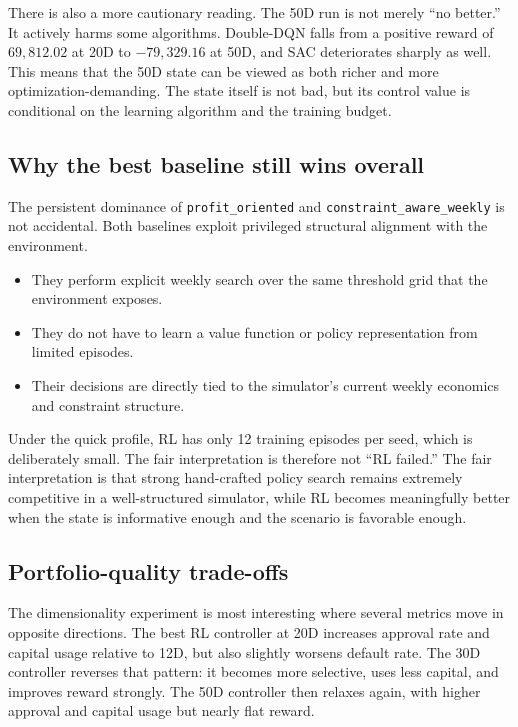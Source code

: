 \documentclass[12pt,a4paper]{article}
\begin{document}
There is also a more cautionary reading. The 50D run is not merely ``no better.'' It actively harms some algorithms. Double-DQN falls from a positive reward of $69{,}812.02$ at 20D to $-79{,}329.16$ at 50D, and SAC deteriorates sharply as well. This means that the 50D state can be viewed as both richer and more optimization-demanding. The state itself is not bad, but its control value is conditional on the learning algorithm and the training budget.

\subsection{Why the best baseline still wins overall}

The persistent dominance of \texttt{profit\_oriented} and \texttt{constraint\_aware\_weekly} is not accidental. Both baselines exploit privileged structural alignment with the environment.
\begin{itemize}[leftmargin=*]
    \item They perform explicit weekly search over the same threshold grid that the environment exposes.
    \item They do not have to learn a value function or policy representation from limited episodes.
    \item Their decisions are directly tied to the simulator's current weekly economics and constraint structure.
\end{itemize}

Under the quick profile, RL has only 12 training episodes per seed, which is deliberately small. The fair interpretation is therefore not ``RL failed.'' The fair interpretation is that strong hand-crafted policy search remains extremely competitive in a well-structured simulator, while RL becomes meaningfully better when the state is informative enough and the scenario is favorable enough.

\subsection{Portfolio-quality trade-offs}

The dimensionality experiment is most interesting where several metrics move in opposite directions. The best RL controller at 20D increases approval rate and capital usage relative to 12D, but also slightly worsens default rate. The 30D controller reverses that pattern: it becomes more selective, uses less capital, and improves reward strongly. The 50D controller then relaxes again, with higher approval and capital usage but nearly flat reward.
\end{document}

